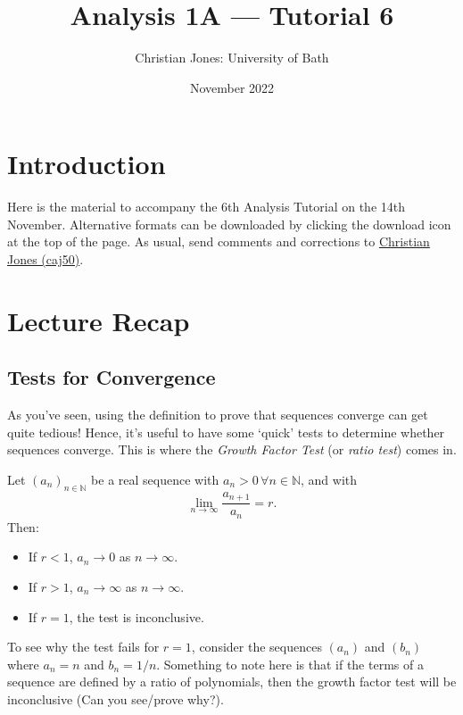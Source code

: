 \documentclass[
  17pt,
  a4paper]{extarticle}
\title{Analysis 1A --- Tutorial 6}
\author{Christian Jones: University of Bath}
\date{November 2022}
\providecommand{\tightlist}{%
  \setlength{\itemsep}{0pt}\setlength{\parskip}{0pt}}
\theoremstyle{plain}
\theoremstyle{plain}
\theoremstyle{plain}
\theoremstyle{plain}
\theoremstyle{plain}
\theoremstyle{definition}
\theoremstyle{definition}
\theoremstyle{definition}
\theoremstyle{remark}
\let\BeginKnitrBlock\begin \let\EndKnitrBlock\end
\renewcommand{\;}{\,}
\begin{document}
\maketitle

{
\setcounter{tocdepth}{2}
\tableofcontents
}
\newpage
{}

\hypertarget{introduction}{%
\section*{Introduction}\label{introduction}}

Here is the material to accompany the 6th Analysis Tutorial on the 14th November. Alternative formats can be downloaded by clicking the download icon at the top of the page. As usual, send comments and corrections to \href{mailto:caj50@bath.ac.uk}{Christian Jones (caj50)}.

\hypertarget{lecture-recap}{%
\section{Lecture Recap}\label{lecture-recap}}

\hypertarget{tests-for-convergence}{%
\subsection{Tests for Convergence}\label{tests-for-convergence}}

As you've seen, using the definition to prove that sequences converge can get quite tedious! Hence, it's useful to have some `quick' tests to determine whether sequences converge. This is where the \emph{Growth Factor Test} (or \emph{ratio test}) comes in.

\BeginKnitrBlock{theorem}[Growth Factor Test]
{\label{thm:thm1} }Let \((a_n)_{n\in\mathbb{N}}\) be a real sequence with \(a_n>0 \; \forall n\in\mathbb{N}\), and with \[\lim_{n\to\infty} \frac{a_{n+1}}{a_n} = r.\] Then:

\begin{itemize}
\tightlist
\item
  If \(r < 1\), \(a_n \to 0\) as \(n \to \infty\).
\item
  If \(r > 1\), \(a_n \to \infty\) as \(n \to \infty\).
\item
  If \(r = 1\), the test is inconclusive.
\end{itemize}
\EndKnitrBlock{theorem}

To see why the test fails for \(r = 1\), consider the sequences \((a_n)\) and \((b_n)\) where \(a_n = n\) and \(b_n = 1/n\). Something to note here is that if the terms of a sequence are defined by a ratio of polynomials, then the growth factor test will be inconclusive (Can you see/prove why?).
\end{document}
